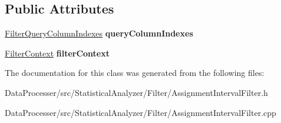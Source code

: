 \subsection*{Public Attributes}
\begin{DoxyCompactItemize}
\item 
\mbox{\label{classAssignmentIntervalFilter_aadf2eaa2ab5e7bf8d620b2baacaf5d16}} 
\hyperlink{structFilterQueryColumnIndexes}{Filter\+Query\+Column\+Indexes} {\bfseries query\+Column\+Indexes}
\item 
\mbox{\label{classAssignmentIntervalFilter_a79a00626642f1b66af389e4e41f3aa83}} 
\hyperlink{structFilterContext}{Filter\+Context} {\bfseries filter\+Context}
\end{DoxyCompactItemize}


The documentation for this class was generated from the following files\+:\begin{DoxyCompactItemize}
\item 
Data\+Processer/src/\+Statistical\+Analyzer/\+Filter/Assignment\+Interval\+Filter.\+h\item 
Data\+Processer/src/\+Statistical\+Analyzer/\+Filter/Assignment\+Interval\+Filter.\+cpp\end{DoxyCompactItemize}
